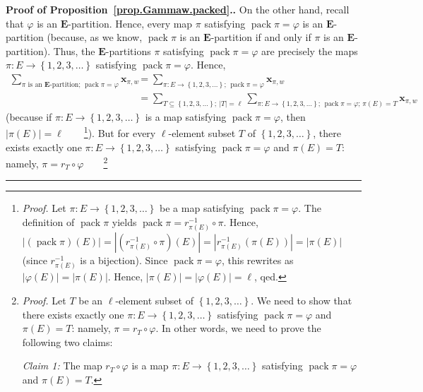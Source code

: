 \documentclass[numbers=enddot,12pt,final,onecolumn,notitlepage,abstracton]{scrartcl}%
\theoremstyle{definition}
\newenvironment{proof}[1][Proof]{\noindent\textbf{#1.} }{\ \rule{0.5em}{0.5em}}
\let\sumnonlimits\sum
\renewcommand{\sum}{\sumnonlimits\limits}
\newcommand{\xx}{{\mathbf{x}}}
\newcommand{\pack}{\operatorname{pack}}
\newcommand{\EE}{{\mathbf{E}}}
\begin{document}
\begin{proof}[Proof of Proposition~\ref{prop.Gammaw.packed}.]
On the other hand, recall that $\varphi$ is an $\EE$-partition.
Hence, every map $\pi$ satisfying $\pack \pi = \varphi$
is an $\EE$-partition (because, as we know, $\pack \pi$ is an
$\EE$-partition if and only if $\pi$ is an $\EE$-partition).
Thus, the $\EE$-partitions $\pi$ satisfying
$\pack \pi = \varphi$ are precisely the maps
$\pi : E \to \left\{1, 2, 3, \ldots\right\}$ satisfying
$\pack \pi = \varphi$. Hence,
\begin{align*}
\sum_{\pi\text{ is an }\EE\text{-partition; } \pack \pi = \varphi}
\xx_{\pi, w}
&= \sum_{\pi : E \to \left\{1, 2, 3, \ldots\right\} \text{; } \pack \pi = \varphi}
\xx_{\pi, w} \\
&= \sum_{T \subseteq \left\{1, 2, 3, \ldots\right\} ; \ \left|T\right| = \ell}
\sum_{\pi : E \to \left\{1, 2, 3, \ldots\right\} \text{; } \pack \pi = \varphi
\text{; } \pi\left(E\right) = T}
\xx_{\pi, w}
\end{align*}
(because if $\pi : E \to \left\{1, 2, 3, \ldots\right\}$ is a map
satisfying $\pack \pi = \varphi$, then
$\left|\pi\left(E\right)\right| = \ell$\ \ \ \ \footnote{\textit{Proof.}
Let $\pi : E \to \left\{1, 2, 3, \ldots\right\}$ be a map
satisfying $\pack \pi = \varphi$. The definition of $\pack \pi$
yields $\pack \pi = r_{\pi\left(E\right)}^{-1} \circ \pi$. Hence,
$\left|\left(\pack \pi\right)\left(E\right)\right|
= \left|\left(r_{\pi\left(E\right)}^{-1} \circ \pi\right)\left(E\right)\right|
= \left|r_{\pi\left(E\right)}^{-1} \left(\pi\left(E\right)\right)\right|
= \left|\pi\left(E\right)\right|$
(since $r_{\pi\left(E\right)}^{-1}$ is a bijection). Since
$\pack \pi = \varphi$, this rewrites as
$\left|\varphi\left(E\right)\right| = \left|\pi\left(E\right)\right|$.
Hence, $ \left|\pi\left(E\right)\right|
= \left|\varphi\left(E\right)\right| = \ell$, qed.}). But for every
$\ell$-element subset $T$ of
$\left\{1, 2, 3, \ldots\right\}$, there exists exactly
one $\pi : E \to \left\{1, 2, 3, \ldots\right\}$ satisfying
$\pack \pi = \varphi$ and $\pi\left(E\right) = T$: namely,
$\pi = r_T \circ \varphi$\ \ \ \ \footnote{\textit{Proof.}
Let $T$ be an $\ell$-element subset of $\left\{
1,2,3,\ldots\right\}  $. We need to show that there exists exactly one
$\pi:E\rightarrow\left\{  1,2,3,\ldots\right\}  $ satisfying
$\operatorname{pack}\pi=\varphi$ and $\pi\left(  E\right)  =T$: namely,
$\pi=r_{T}\circ\varphi$. In other words, we need to prove the following two claims:

\textit{Claim 1:} The map $r_{T}\circ\varphi$ is a map $\pi:E\rightarrow
\left\{  1,2,3,\ldots\right\}  $ satisfying $\operatorname{pack}\pi=\varphi$
and $\pi\left(  E\right)  =T$.

}
\end{proof}
\end{document}
